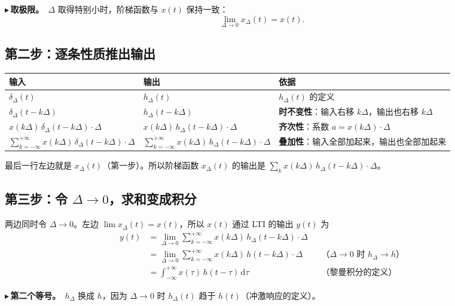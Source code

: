 \documentclass[UTF8,a4paper,11pt]{ctexart}
\newcounter{ex}[section]
\newcommand{\point}[1]{\par\addvspace{1ex}\noindent\textcolor{ptteal}{$\blacktriangleright$\,\textbf{#1}}\ }
\begin{document}
\point{取极限。}$\Delta$ 取得特别小时，阶梯函数与 $x(t)$ 保持一致：
\[
\lim_{\Delta\to0}x_\Delta(t)=x(t).
\]

\subsection{第二步：逐条性质推出输出}
\begin{center}
\small
\renewcommand{\arraystretch}{1.3}
\begin{tabular}{@{}llp{6.0cm}@{}}
\toprule
输入 & 输出 & 依据\\
\midrule
$\delta_\Delta(t)$ & $h_\Delta(t)$ & $h_\Delta(t)$ 的定义\\
$\delta_\Delta(t-k\Delta)$ & $h_\Delta(t-k\Delta)$ & \textbf{时不变性}：输入右移 $k\Delta$，输出也右移 $k\Delta$\\
$x(k\Delta)\,\delta_\Delta(t-k\Delta)\cdot\Delta$ & $x(k\Delta)\,h_\Delta(t-k\Delta)\cdot\Delta$ & \textbf{齐次性}：系数 $a=x(k\Delta)\cdot\Delta$\\
$\sum_{k=-\infty}^{+\infty}x(k\Delta)\,\delta_\Delta(t-k\Delta)\cdot\Delta$ & $\sum_{k=-\infty}^{+\infty}x(k\Delta)\,h_\Delta(t-k\Delta)\cdot\Delta$ & \textbf{叠加性}：输入全部加起来，输出也全部加起来\\
\bottomrule
\end{tabular}
\end{center}
最后一行左边就是 $x_\Delta(t)$（第一步）。所以阶梯函数 $x_\Delta(t)$ 的输出是 $\sum_k x(k\Delta)\,h_\Delta(t-k\Delta)\cdot\Delta$。

\subsection{\texorpdfstring{第三步：令 $\Delta\to0$，求和变成积分}{第三步：令 Δ→0，求和变成积分}}
两边同时令 $\Delta\to0$。左边 $\lim x_\Delta(t)=x(t)$，所以 $x(t)$ 通过 LTI 的输出 $y(t)$ 为
\begin{align*}
y(t)&=\lim_{\Delta\to0}\sum_{k=-\infty}^{+\infty}x(k\Delta)\,h_\Delta(t-k\Delta)\cdot\Delta\\[2pt]
&=\lim_{\Delta\to0}\sum_{k=-\infty}^{+\infty}x(k\Delta)\,h(t-k\Delta)\cdot\Delta
&&\text{（$\Delta\to0$ 时 $h_\Delta\to h$）}\\[2pt]
&=\int_{-\infty}^{+\infty}x(\tau)\,h(t-\tau)\,\mathrm{d}\tau
&&\text{（黎曼积分的定义）}
\end{align*}

\point{第二个等号。}$h_\Delta$ 换成 $h$，因为 $\Delta\to0$ 时 $h_\Delta(t)$ 趋于 $h(t)$（冲激响应的定义）。
\end{document}
